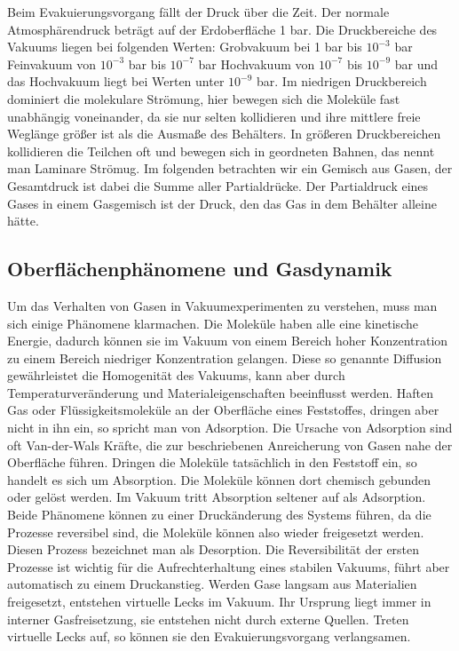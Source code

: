 Beim Evakuierungsvorgang fällt der Druck über die Zeit. Der normale Atmosphärendruck beträgt auf der Erdoberfläche 1 bar.
Die Druckbereiche des Vakuums liegen bei folgenden Werten:
Grobvakuum bei 1 bar bis $10^{-3}$ bar  Feinvakuum von $10^{-3}$ bar bis $10^{-7}$ bar Hochvakuum von $10^{-7}$ bis $10^{-9}$ bar und
das Hochvakuum liegt bei Werten unter $10^{-9}$ bar.
Im niedrigen Druckbereich dominiert die molekulare Strömung, hier bewegen sich die Moleküle fast unabhängig voneinander,
da sie nur selten kollidieren und ihre mittlere freie Weglänge größer ist als die Ausmaße des Behälters.
In größeren Druckbereichen kollidieren die Teilchen oft 
und bewegen sich in geordneten Bahnen, das nennt man Laminare Strömug.
Im folgenden betrachten wir ein Gemisch aus Gasen, der Gesamtdruck ist dabei die Summe aller Partialdrücke. Der Partialdruck eines Gases in einem Gasgemisch
ist der Druck, den das Gas in dem Behälter alleine hätte.



\subsection{Oberflächenphänomene und Gasdynamik}


Um das Verhalten von Gasen in Vakuumexperimenten zu verstehen, muss man sich einige Phänomene klarmachen.
Die Moleküle haben alle
eine kinetische Energie, dadurch können sie im Vakuum von einem Bereich hoher Konzentration zu einem Bereich niedriger Konzentration 
gelangen. Diese so genannte Diffusion gewährleistet die Homogenität des Vakuums, kann aber durch Temperaturveränderung und Materialeigenschaften
beeinflusst werden. Haften Gas oder Flüssigkeitsmoleküle an der Oberfläche eines Feststoffes, dringen aber nicht in ihn ein, so spricht man 
von Adsorption. Die Ursache von Adsorption sind oft Van-der-Wals Kräfte, die zur beschriebenen Anreicherung von Gasen nahe der Oberfläche führen.
Dringen die Moleküle tatsächlich in den Feststoff ein, so handelt es sich um Absorption. Die Moleküle können dort chemisch gebunden oder 
gelöst werden. Im Vakuum tritt Absorption seltener auf als Adsorption. Beide Phänomene können zu einer Druckänderung des Systems führen,
da die Prozesse reversibel sind, die Moleküle können also wieder freigesetzt werden. Diesen Prozess bezeichnet man als Desorption. Die
Reversibilität der ersten Prozesse ist wichtig für die Aufrechterhaltung eines stabilen Vakuums, führt aber automatisch zu einem Druckanstieg. 
Werden Gase langsam aus Materialien freigesetzt, entstehen virtuelle Lecks im Vakuum. Ihr Ursprung liegt immer in interner Gasfreisetzung, 
sie entstehen nicht durch externe Quellen. Treten virtuelle Lecks auf, so können sie den Evakuierungsvorgang verlangsamen.


